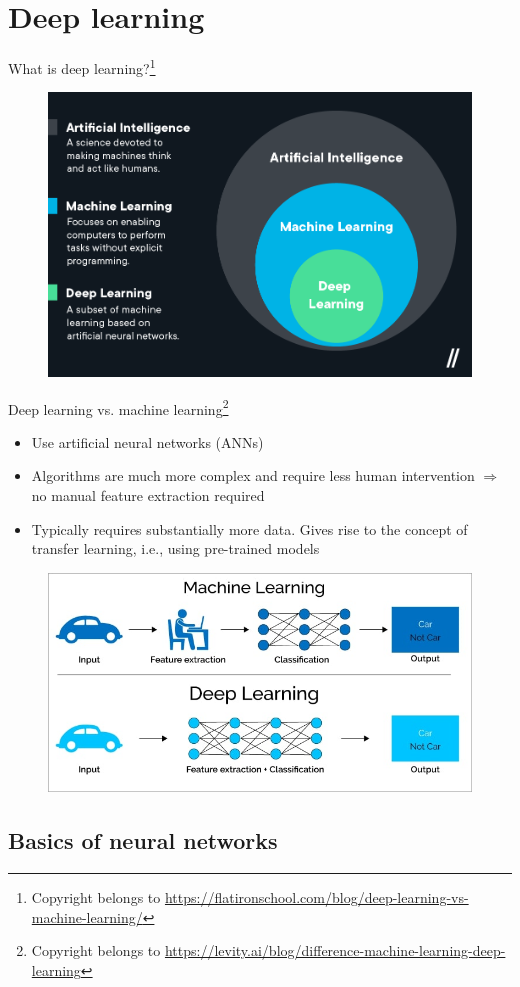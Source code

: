 \documentclass{beamer}
\begin{document}
\section{Deep learning}
\begin{frame}{What is deep learning?\footnote{Copyright belongs to \url{https://flatironschool.com/blog/deep-learning-vs-machine-learning/}}}
\begin{figure}
\includegraphics[width=0.75\linewidth]{Images/AI.png}
\end{figure}
\end{frame}
\begin{frame}{Deep learning vs. machine learning\footnote{Copyright belongs to \url{https://levity.ai/blog/difference-machine-learning-deep-learning}}}
\begin{itemize}
\item Use artificial neural networks (ANNs)
\item Algorithms are much more complex and require less human intervention $\Rightarrow$ no manual feature extraction required
\item Typically requires substantially more data. Gives rise to the concept of transfer learning, i.e., using pre-trained models 
\end{itemize}
\begin{figure}
\includegraphics[width=0.5\linewidth]{Images/ML.jpeg}
\end{figure}
\end{frame}
\subsection{Basics of neural networks}
\end{document}
